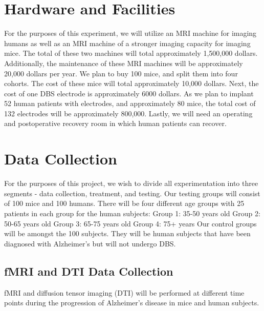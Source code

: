 \documentclass{article}
\begin{document}
\section{Hardware and Facilities}
For the purposes of this experiment, we will utilize an MRI machine for imaging humans as well as an MRI machine of a stronger imaging capacity for imaging mice. The total of these two machines will total approximately 1,500,000 dollars. Additionally, the maintenance of these MRI machines will be approximately 20,000 dollars per year. We plan to buy 100 mice, and split them into four cohorts. The cost of these mice will total approximately 10,000 dollars. Next, the cost of one DBS electrode is approximately 6000 dollars. As we plan to implant 52 human patients with electrodes, and approximately 80 mice, the total cost of 132 electrodes will be approximately 800,000. Lastly, we will need an operating and postoperative recovery room in which human patients can recover. 


\section{Data Collection}
For the purposes of this project, we wish to divide all experimentation into three segments - data collection, treatment, and testing. Our testing groups will consist of 100 mice and 100 humans. There will be four different age groups with 25 patients in each group for the human subjects:
Group 1: 35-50 years old
Group 2: 50-65 years old
Group 3: 65-75 years old
Group 4: 75+ years
Our control groups will be amongst the 100 subjects. They will be human subjects that have been diagnosed with Alzheimer's but will not undergo DBS.

\subsection{fMRI and DTI Data Collection}
fMRI and diffusion tensor imaging (DTI) will be performed at different time points during the progression of Alzheimer's disease in mice and human subjects.
\end{document}
